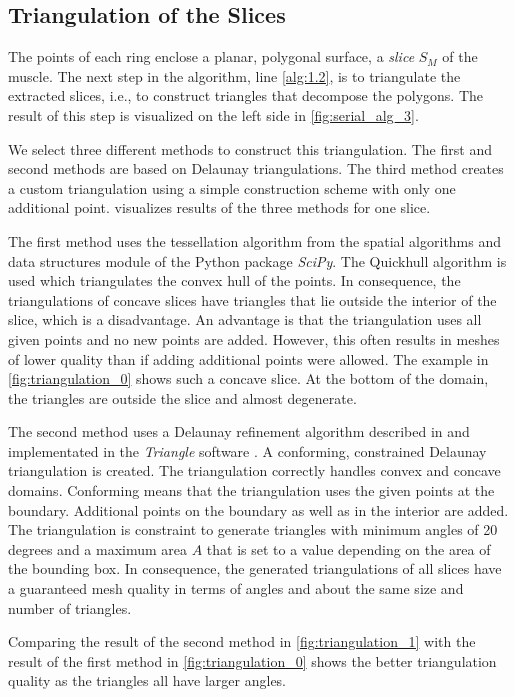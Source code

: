 \subsection{Triangulation of the Slices}\label{sec:triangulation_of_the_slices}
The points of each ring enclose a planar, polygonal surface, a \emph{slice} $S_M$ of the muscle.
The next step in the algorithm, line \ref{alg:1.2}, is to triangulate the extracted slices, i.e., to construct triangles that decompose the polygons. The result of this step is visualized on the left side in \cref{fig:serial_alg_3}.

We select three different methods to construct this triangulation. The first and second methods are based on Delaunay triangulations. The third method creates a custom triangulation using a simple construction scheme with only one additional point.
 visualizes results of the three methods for one slice.

The first method uses the tessellation algorithm from the spatial algorithms and data structures module of the Python package \emph{SciPy}. 
The Quickhull algorithm \cite{quickhull} is used which triangulates the convex hull of the points. In consequence, the triangulations of concave slices have triangles that lie outside the interior of the slice, which is a disadvantage. An advantage is that the triangulation uses all given points and no new points are added. However, this often results in meshes of lower quality than if adding additional points were allowed.
The example in \cref{fig:triangulation_0} shows such a concave slice. At the bottom of the domain, the triangles are outside the slice and almost degenerate.

The second method uses a Delaunay refinement algorithm described in \cite{Delaunay2002} and implementated in the \emph{Triangle} software \cite{shewchuk96b}. A conforming, constrained Delaunay triangulation is created. The triangulation correctly handles convex and concave domains.
Conforming means that the triangulation uses the given points at the boundary. Additional points on the boundary as well as in the interior are added. The triangulation is constraint to generate triangles with minimum angles of 20 degrees and a maximum area $A$ that is set to a value depending on the area of the bounding box. In consequence, the generated triangulations of all slices have a guaranteed mesh quality in terms of angles and about the same size and number of triangles.

Comparing the result of the second method in \cref{fig:triangulation_1} with the result of the first method in \cref{fig:triangulation_0} shows the better triangulation quality as the triangles all have larger angles.

